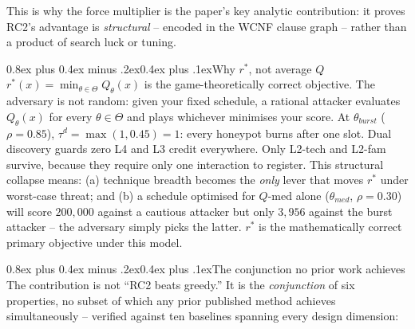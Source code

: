 \documentclass[10pt,twocolumn]{article}
\makeatletter
\renewcommand{\subsection}{\@startsection{subsection}{2}{0pt}%
  {0.8ex plus 0.4ex minus .2ex}{0.4ex plus .1ex}{\normalfont\bfseries}}
\makeatother
\begin{document}
This is why the force multiplier is the paper's key analytic contribution: it proves RC2's advantage is \emph{structural} -- encoded in the WCNF clause graph -- rather than a product of search luck or tuning.

\subsection{Why $r^*$, not average $Q$}
$r^*(x) = \min_{\theta\in\Theta} Q_\theta(x)$ is the game-theoretically correct objective. The adversary is not random: given your fixed schedule, a rational attacker evaluates $Q_\theta(x)$ for every $\theta\in\Theta$ and plays whichever minimises your score. At $\theta_{burst}$ ($\rho{=}0.85$), $\tau^d{=}\max(1,0.45){=}1$: every honeypot burns after one slot. Dual discovery guards zero L4 and L3 credit everywhere. Only L2-tech and L2-fam survive, because they require only one interaction to register. This structural collapse means: (a) technique breadth becomes the \emph{only} lever that moves $r^*$ under worst-case threat; and (b) a schedule optimised for $Q$-med alone ($\theta_{med}$, $\rho{=}0.30$) will score $200{,}000$ against a cautious attacker but only $3{,}956$ against the burst attacker -- the adversary simply picks the latter. $r^*$ is the mathematically correct primary objective under this model.

\subsection{The conjunction no prior work achieves}
The contribution is not ``RC2 beats greedy.'' It is the \emph{conjunction} of six properties, no subset of which any prior published method achieves simultaneously -- verified against ten baselines spanning every design dimension:
\end{document}
